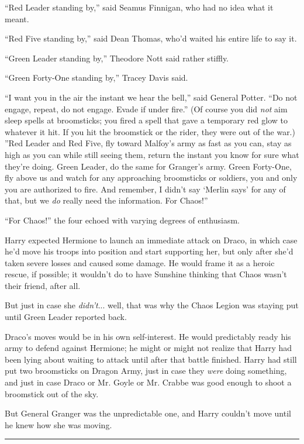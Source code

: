 ``Red Leader standing by,'' said Seamus Finnigan, who had no idea what
it meant.

``Red Five standing by,'' said Dean Thomas, who'd waited his entire life
to say it.

``Green Leader standing by,'' Theodore Nott said rather stiffly.

``Green Forty-One standing by,'' Tracey Davis said.

``I want you in the air the instant we hear the bell,'' said General
Potter. ``Do not engage, repeat, do not engage. Evade if under fire.''
(Of course you did \emph{not} aim sleep spells at broomsticks; you fired
a spell that gave a temporary red glow to whatever it hit. If you hit
the broomstick or the rider, they were out of the war.) ''Red Leader and
Red Five, fly toward Malfoy's army as fast as you can, stay as high as
you can while still seeing them, return the instant you know for sure
what they're doing. Green Leader, do the same for Granger's army. Green
Forty-One, fly above us and watch for any approaching broomsticks or
soldiers, you and only you are authorized to fire. And remember, I
didn't say `Merlin says' for any of that, but we \emph{do} really need
the information. For Chaos!''

``For Chaos!'' the four echoed with varying degrees of enthusiasm.

Harry expected Hermione to launch an immediate attack on Draco, in which
case he'd move his troops into position and start supporting her, but
only after she'd taken severe losses and caused some damage. He would
frame it as a heroic rescue, if possible; it wouldn't do to have
Sunshine thinking that Chaos wasn't their friend, after all.

But just in case she \emph{didn't}... well, that was why the Chaos
Legion was staying put until Green Leader reported back.

Draco's moves would be in his own self-interest. He would predictably
ready his army to defend against Hermione; he might or might not realize
that Harry had been lying about waiting to attack until after that
battle finished. Harry had still put two broomsticks on Dragon Army,
just in case they \emph{were} doing something, and just in case Draco or
Mr. Goyle or Mr. Crabbe was good enough to shoot a broomstick out of the
sky.

But General Granger was the unpredictable one, and Harry couldn't move
until he knew how she was moving.

\begin{center}\rule{3in}{0.4pt}\end{center}

